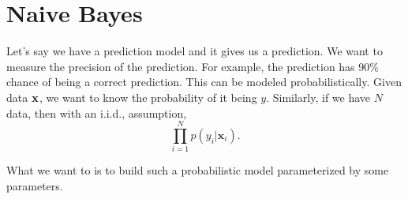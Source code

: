 \section{Naive Bayes}
\label{sec:naive_bayes}

Let's say we have a prediction model and it gives us a prediction. We want to measure the precision of the prediction. For example, the prediction has 90\% chance of being a correct prediction. This can be modeled probabilistically. Given data ${\mathbf{x}}$, we want to know the probability of it being $y$. Similarly, if we have $N$ data, then with an i.i.d., assumption,
$$\prod_{i=1}^N p(y_i|\mathbf{x}_i).$$

What we want to is to build such a probabilistic model parameterized by some parameters. 

